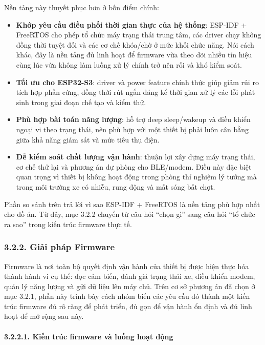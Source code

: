 \documentclass[a4paper]{extarticle}
\providecommand{\tightlist}{%
  \setlength{\itemsep}{0pt}\setlength{\parskip}{0pt}}
\begin{document}
Nền tảng này thuyết phục hơn ở bốn điểm chính:

\begin{itemize}
\tightlist
\item
  \textbf{Khớp yêu cầu điều phối thời gian thực của hệ thống}: ESP-IDF +
  FreeRTOS cho phép tổ chức máy trạng thái trung tâm, các driver chạy
  không đồng thời tuyệt đối và các cơ chế khóa/chờ ở mức khối chức năng. Nói cách khác, đây là
  nền tảng đủ linh hoạt để firmware vừa theo dõi nhiều tín hiệu cùng lúc
  vừa không làm luồng xử lý chính trở nên rối và khó kiểm soát.
\item
  \textbf{Tối ưu cho ESP32-S3}: driver và power feature chính thức giúp
  giảm rủi ro tích hợp phần cứng, đồng thời rút ngắn đáng kể thời gian
  xử lý các lỗi phát sinh trong giai đoạn chế tạo và kiểm thử.
\item
  \textbf{Phù hợp bài toán năng lượng}: hỗ trợ deep sleep/wakeup và điều
  khiển ngoại vi theo trạng thái, nên phù hợp với một thiết bị phải
  luôn cân bằng giữa khả năng giám sát và mức tiêu thụ điện.
\item
  \textbf{Dễ kiểm soát chất lượng vận hành}: thuận lợi xây dựng máy
  trạng thái, cơ chế thử lại và phương án dự phòng cho BLE/modem. Điều này đặc biệt
  quan trọng vì thiết bị không hoạt động trong phòng thí nghiệm lý tưởng
  mà trong môi trường xe có nhiễu, rung động và mất sóng bất chợt.
\end{itemize}

Phần so sánh trên trả lời vì sao ESP-IDF + FreeRTOS là nền tảng phù hợp
nhất cho đồ án. Từ đây, mục 3.2.2 chuyển từ câu hỏi ``chọn gì'' sang câu
hỏi ``tổ chức ra sao'' trong kiến trúc firmware thực tế.

\subsubsection{3.2.2. Giải pháp
Firmware}\label{322-giux1ea3i-phuxe1p-firmware}

Firmware là nơi toàn bộ quyết định vận hành của thiết bị được hiện thực
hóa thành hành vi cụ thể: đọc cảm biến, đánh giá trạng thái xe, điều
khiển modem, quản lý năng lượng và gửi dữ liệu lên máy chủ. Trên cơ sở
phương án đã chọn ở mục 3.2.1, phần này trình bày cách nhóm biến các yêu
cầu đó thành một kiến trúc firmware đủ rõ ràng để phát triển, đủ gọn để
vận hành ổn định và đủ linh hoạt để mở rộng sau này.

\paragraph{3.2.2.1. Kiến trúc firmware và luồng hoạt
động}\label{3221-kiux1ebfn-truxfac-firmware-vuxe0-luux1ed3ng-houx1ea1t-ux111ux1ed9ng}
\end{document}
